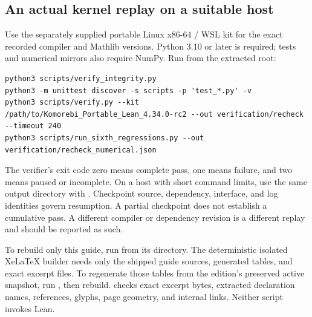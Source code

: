 \subsection{An actual kernel replay on a suitable host}
Use the separately supplied portable Linux x86-64 / WSL kit for the exact recorded compiler and Mathlib versions. Python 3.10 or later is required; tests and numerical mirrors also require NumPy. Run from the extracted  root:
\begin{Verbatim}[fontsize=\small,breaklines=true,breakanywhere=true,frame=leftline]
python3 scripts/verify_integrity.py
python3 -m unittest discover -s scripts -p 'test_*.py' -v
python3 scripts/verify.py --kit /path/to/Komorebi_Portable_Lean_4.34.0-rc2 --out verification/recheck --timeout 240
python3 scripts/run_sixth_regressions.py --out verification/recheck_numerical.json
\end{Verbatim}
The verifier's exit code zero means complete pass, one means failure, and two means paused or incomplete. On a host with short command limits, use the same output directory with . Checkpoint source, dependency, interface, and log identities govern resumption. A partial checkpoint does not establish a cumulative pass. A different compiler or dependency revision is a different replay and should be reported as such.

To rebuild only this guide, run  from its directory. The deterministic isolated XeLaTeX builder needs only the shipped guide sources, generated tables, and exact excerpt files. To regenerate those tables from the edition's preserved active snapshot, run , then rebuild.  checks exact excerpt bytes, extracted declaration names, references, glyphs, page geometry, and internal links. Neither script invokes Lean.

